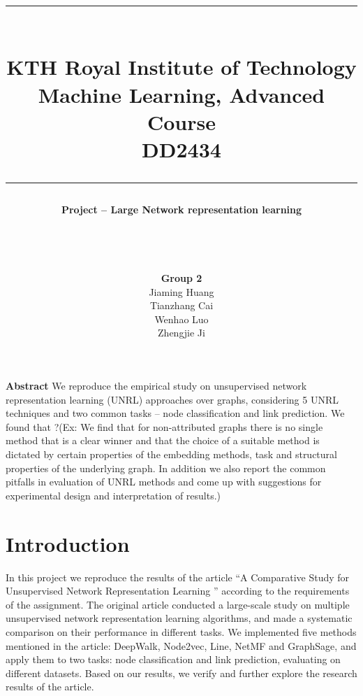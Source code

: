 \documentclass[a4paper]{article}
\title{\rule[0.5cm]{\textwidth}{0.1mm}
\\KTH Royal Institute of Technology
\\\vspace{0.5em}
Machine Learning, Advanced Course
\\\vspace{0.5em}
DD2434
\\\rule[0cm]{\textwidth}{0.1mm}\vspace{4em}}
\author
{\Large\textbf{{Project -- Large Network representation learning}}
\\\\\\\\\\\vspace{0.5em}
\Large{\textbf{Group 2}}\\\vspace{0.2em}
\Large{Jiaming Huang}\\\vspace{0.2em}
\Large{Tianzhang Cai}\\\vspace{0.2em}
\Large{Wenhao Luo}\\\vspace{0.2em}
\Large{Zhengjie Ji}
\\\vspace{2em}}
\begin{document}
\maketitle
\thispagestyle{empty}



\vspace{1em}\noindent \textbf{Abstract} We reproduce the empirical study on unsupervised network representation learning (UNRL) approaches over graphs, considering 5 UNRL techniques and two common tasks – node classification and link prediction. We found that ?(Ex:  We find that for non-attributed graphs there is no single method that is a clear winner and that the choice of a suitable method is dictated by certain properties of the embedding methods, task and structural properties of the underlying graph. In addition we also report the common pitfalls in evaluation of UNRL methods and come up with suggestions for experimental design and interpretation of results.)

\newpage
\setcounter{page}{1}


\section{Introduction}





\noindent In this project we reproduce the results of the article “A Comparative Study for Unsupervised Network Representation Learning \cite{1}” according to the requirements of the assignment. The original article conducted a large-scale study on multiple unsupervised network representation learning algorithms, and made a systematic comparison on their performance in different tasks. We implemented five methods mentioned in the article: DeepWalk, Node2vec, Line, NetMF and GraphSage, and apply them to two tasks: node classification and link prediction, evaluating on different datasets. Based on our results, we verify and further explore the research results of the article.
\end{document}
